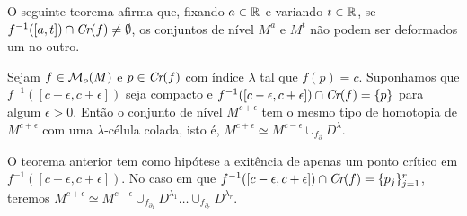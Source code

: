 \documentclass{beamer}
\begin{document}
	\begin{frame}
		O seguinte teorema afirma que, fixando $a \in \mathbb{R}^{}$ e variando $t \in \mathbb{R}^{}$, se $f^{-1}([a,t]) \cap \textit{Cr}(f) \neq \emptyset$, os conjuntos de nível $M^{a}$ e $M^{t}$ não podem ser deformados um no outro.
		
		\begin{teorema}
			Sejam $f\in \mathcal{M}_{o}(M)$ e $p\in \textit{Cr}(f)$ com índice $\lambda$ tal que $f(p) = c$. Suponhamos que $f^{-1}([c-\epsilon,c+\epsilon])$ seja compacto e $f^{-1}([c-\epsilon,c+\epsilon])\cap \textit{Cr}(f) = \{p\}$ para algum $\epsilon>0$. Então o conjunto de nível $M^{c+\epsilon}$ tem o mesmo tipo de homotopia de $M^{c+\epsilon}$ com uma $\lambda$-célula colada, isto é, $M^{c+\epsilon} \simeq M^{c-\epsilon}\cup_{f_{\partial}} D^{\lambda}$.
		\end{teorema}
		
		\pause
		\begin{observacao}
			O teorema anterior tem como hipótese a exitência de apenas um ponto crítico em $f^{-1}([c-\epsilon,c+\epsilon])$. No caso em que $f^{-1}([c-\epsilon,c+\epsilon]) \cap \textit{Cr}(f) = \{p_{j}\}_{j=1}^{r}$, teremos $M^{c+\epsilon} \simeq M^{c-\epsilon}\cup_{f_{\partial_{1}}} D^{\lambda_{1}}\dots  \cup_{f_{\partial_{r}}} D^{\lambda_{r}}$.
		\end{observacao}
	\end{frame}
	
\end{document}
